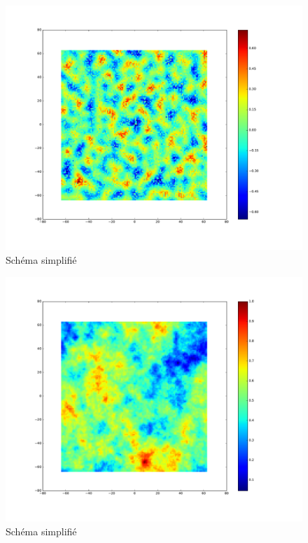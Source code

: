 \begin{figure}[th]
\centering
\includegraphics[scale=0.4]{Figures/perlin_noise}
\decoRule
\caption[Figure]{Schéma simplifié}
\label{fig:perlin_noise}
\end{figure}

\begin{figure}[th]
\centering
\includegraphics[scale=0.4]{Figures/motioncloud_noise}
\decoRule
\caption[Figure]{Schéma simplifié}
\label{fig:motioncloud_noise}
\end{figure}

